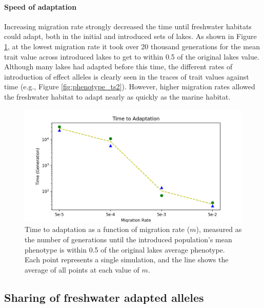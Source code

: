 \documentclass{article}
\begin{document}
\paragraph*{Speed of adaptation}
Increasing migration rate strongly decreased the time until freshwater habitats could adapt,
both in the initial and introduced sets of lakes.
As shown in Figure \ref{fig:TimeToAdaptation}, at the lowest migration rate 
it took over 20 thousand generations for the mean trait value across introduced lakes to 
get to within 0.5 of the original lakes value.
Although many lakes had adapted before this time,
the different rates of introduction of effect alleles is clearly seen in the traces
of trait values against time (e.g., Figure \ref{fig:phenotype_ts2}).
However, higher migration rates allowed the freshwater habitat to adapt
nearly as quickly as the marine habitat.

\begin{figure}
	\begin{center}
        \includegraphics[width=0.8\linewidth]{matplotlibPlots/TimeToAdaptation}
        \caption{
            Time to adaptation as a function of migration rate ($m$),
            measured as the number of generations
            until the introduced population's mean phenotype is within 0.5 
            of the original lakes average phenotype. 
            Each point represents a single simulation, and
            the line shows the average of all points at each value of $m$.
        }
  		\label{fig:TimeToAdaptation}
	\end{center}
\end{figure}


\subsection*{Sharing of freshwater adapted alleles}

\end{document}
